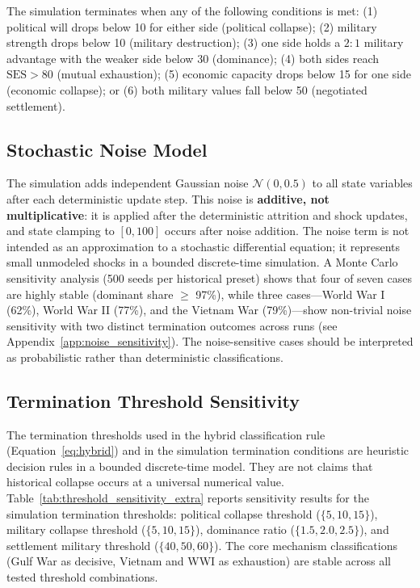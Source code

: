 The simulation terminates when any of the following conditions is met: (1) political will drops below 10 for either side (political collapse); (2) military strength drops below 10 (military destruction); (3) one side holds a $2\!:\!1$ military advantage with the weaker side below 30 (dominance); (4) both sides reach $\text{SES} > 80$ (mutual exhaustion); (5) economic capacity drops below 15 for one side (economic collapse); or (6) both military values fall below 50 (negotiated settlement).

\subsection{Stochastic Noise Model}

The simulation adds independent Gaussian noise $\mathcal{N}(0, 0.5)$ to all state variables after each deterministic update step. This noise is \textbf{additive, not multiplicative}: it is applied after the deterministic attrition and shock updates, and state clamping to $[0, 100]$ occurs after noise addition. The noise term is not intended as an approximation to a stochastic differential equation; it represents small unmodeled shocks in a bounded discrete-time simulation. A Monte Carlo sensitivity analysis (500 seeds per historical preset) shows that four of seven cases are highly stable (dominant share $\geq$ 97\%), while three cases---World War I (62\%), World War II (77\%), and the Vietnam War (79\%)---show non-trivial noise sensitivity with two distinct termination outcomes across runs (see Appendix~\ref{app:noise_sensitivity}). The noise-sensitive cases should be interpreted as probabilistic rather than deterministic classifications.

\subsection{Termination Threshold Sensitivity}

The termination thresholds used in the hybrid classification rule (Equation~\ref{eq:hybrid}) and in the simulation termination conditions are heuristic decision rules in a bounded discrete-time model. They are not claims that historical collapse occurs at a universal numerical value. Table~\ref{tab:threshold_sensitivity_extra} reports sensitivity results for the simulation termination thresholds: political collapse threshold ($\{5, 10, 15\}$), military collapse threshold ($\{5, 10, 15\}$), dominance ratio ($\{1.5, 2.0, 2.5\}$), and settlement military threshold ($\{40, 50, 60\}$). The core mechanism classifications (Gulf War as decisive, Vietnam and WWI as exhaustion) are stable across all tested threshold combinations.


